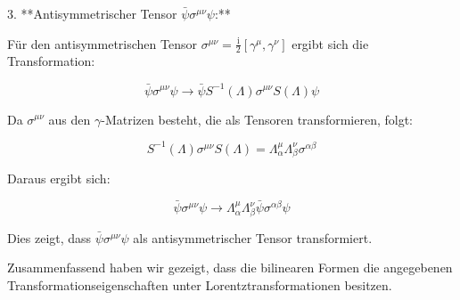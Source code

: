 3. **Antisymmetrischer Tensor $\bar{\psi} \sigma^{\mu \nu} \psi$:**

Für den antisymmetrischen Tensor $\sigma^{\mu \nu} = \frac{\mathrm{i}}{2} [\gamma^\mu, \gamma^\nu]$ ergibt sich die Transformation:

\[
\bar{\psi} \sigma^{\mu \nu} \psi \rightarrow \bar{\psi} S^{-1}(\Lambda) \sigma^{\mu \nu} S(\Lambda) \psi
\]

Da $\sigma^{\mu \nu}$ aus den $\gamma$-Matrizen besteht, die als Tensoren transformieren, folgt:

\[
S^{-1}(\Lambda) \sigma^{\mu \nu} S(\Lambda) = \Lambda_\alpha^\mu \Lambda_\beta^\nu \sigma^{\alpha \beta}
\]

Daraus ergibt sich:

\[
\bar{\psi} \sigma^{\mu \nu} \psi \rightarrow \Lambda_\alpha^\mu \Lambda_\beta^\nu \bar{\psi} \sigma^{\alpha \beta} \psi
\]

Dies zeigt, dass $\bar{\psi} \sigma^{\mu \nu} \psi$ als antisymmetrischer Tensor transformiert. 

Zusammenfassend haben wir gezeigt, dass die bilinearen Formen die angegebenen Transformationseigenschaften unter Lorentztransformationen besitzen.